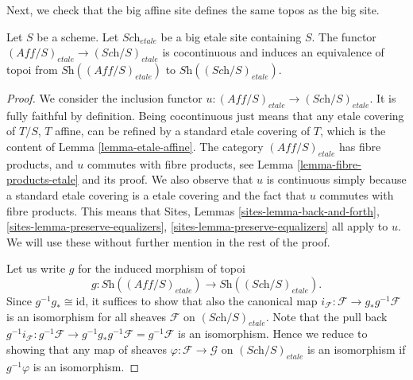 \noindent
Next, we check that the big affine site defines the same
topos as the big site.

\begin{lemma}
\label{lemma-affine-big-site-etale}
Let $S$ be a scheme. Let $\textit{Sch}_{etale}$ be a big etale
site containing $S$.
The functor $(\textit{Aff}/S)_{etale} \to (\textit{Sch}/S)_{etale}$
is cocontinuous and induces an equivalence of topoi from
$\textit{Sh}((\textit{Aff}/S)_{etale})$ to
$\textit{Sh}((\textit{Sch}/S)_{etale})$.
\end{lemma}

\begin{proof}
We consider the inclusion functor
$u : (\textit{Aff}/S)_{etale} \to (\textit{Sch}/S)_{etale}$.
It is fully faithful by definition. Being cocontinuous
just means that any etale covering of $T/S$, $T$ affine,
can be refined by a standard etale covering of $T$, which
is the content of Lemma \ref{lemma-etale-affine}.
The category $(\textit{Aff}/S)_{etale}$ has fibre products, and $u$ commutes
with fibre products, see Lemma \ref{lemma-fibre-products-etale}
and its proof.
We also observe that $u$ is continuous
simply because a standard etale covering is a etale covering
and the fact that $u$ commutes with fibre products.
This means that
Sites, Lemmas \ref{sites-lemma-back-and-forth},
\ref{sites-lemma-preserve-equalizers},
\ref{sites-lemma-preserve-equalizers} all apply to $u$.
We will use these without further mention in the rest of the proof.

\medskip\noindent
Let us write $g$ for the induced morphism of topoi
$$
g : \textit{Sh}((\textit{Aff}/S)_{etale}) \longrightarrow
\textit{Sh}((\textit{Sch}/S)_{etale}).
$$
Since $g^{-1}g_* \cong \text{id}$, it suffices to show that
also the canonical map
$i_{\mathcal{F}} : \mathcal{F} \to g_* g^{-1} \mathcal{F}$
is an isomorphism for all sheaves $\mathcal{F}$ on
$(\textit{Sch}/S)_{etale}$. Note that the pull back
$g^{-1}i_{\mathcal{F}} : g^{-1} \mathcal{F} \to
g^{-1} g_* g^{-1} \mathcal{F} = g^{-1} \mathcal{F}$
is an isomorphism. Hence we reduce to showing that any
map of sheaves $\varphi : \mathcal{F} \to \mathcal{G}$ on
$(\textit{Sch}/S)_{etale}$ is an isomorphism if $g^{-1}\varphi$
is an isomorphism.


\end{proof}
